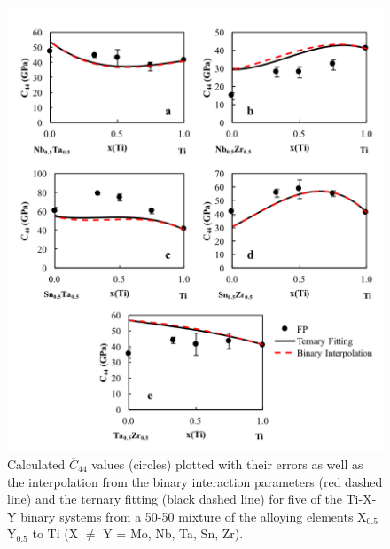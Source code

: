 \pagebreak
\begin{figure}[H]
	\centering
	\includegraphics[width=\textwidth]{Chapter-6/Figures/tixyc442.png}
	\caption{Calculated $\overline{C}_{44}$ values (circles) plotted with their errors as well as the interpolation from the binary interaction parameters (red dashed line) and the ternary fitting (black dashed line) for five of the Ti-X-Y binary systems from a 50-50 mixture of the alloying elements X$_{0.5}$Y$_{0.5}$ to Ti (X $\neq$ Y = Mo, Nb, Ta, Sn, Zr).}
	\label{Ch6-figure:tixyc44_2}
\end{figure}

